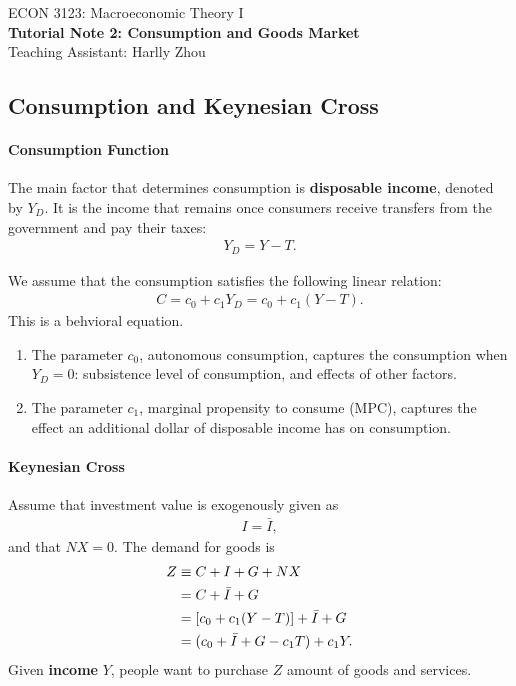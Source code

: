 \documentclass[12pt]{article}
\begin{document}
\begin{center}
    ECON 3123: Macroeconomic Theory I\\
    {\large \textbf{Tutorial Note 2: Consumption and Goods Market}}\\
    Teaching Assistant: Harlly Zhou
\end{center}



\subsection*{Consumption and Keynesian Cross}
\paragraph{Consumption Function}
The main factor that determines consumption is \textbf{disposable income}, denoted by $Y_D$. It is the income that remains once consumers receive transfers from the government and pay their taxes:
\begin{align*}
    Y_D = Y - T.
\end{align*}

We assume that the consumption satisfies the following linear relation:
\begin{align*}
    C = c_0 + c_1 Y_D = c_0 + c_1 (Y-T).
\end{align*}
This is a behvioral equation. 
\begin{enumerate}
    \item The parameter $c_0$, autonomous consumption, captures the consumption when $Y_D=0$: subsistence level of consumption, and effects of other factors.
    \item The parameter $c_1$, marginal propensity to consume (MPC),
    captures the effect an additional dollar of disposable income has on consumption.
\end{enumerate}

\paragraph{Keynesian Cross}
Assume that investment value is exogenously given as
\begin{align*}
    I = \bar{I},
\end{align*}
and that $NX=0$. 
The demand for goods is
\begin{align}\label{eq:demand_v1}
    Z &\equiv C + I + G + NX \notag \\
    &= C + \bar{I} + G \notag \\
    &= [c_0 + c_1(Y-T)] + \bar{I} + G \notag \\
    &= (c_0 + \bar{I} + G - c_1T) + c_1Y.
\end{align}
Given \textbf{income} $Y$, people want to purchase $Z$ amount of goods and services.
\end{document}

